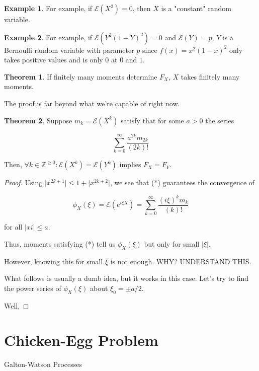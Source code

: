 \documentclass{article}
\theoremstyle{definition}
\newtheorem{theorem}{Theorem}[section]
\newtheorem{example}{Example}[theorem]
\newcommand{\Z}{\mathbb{Z}}
\begin{document}
\begin{example}
    For example, if $\mathcal{E}(X^{2}) = 0$, then $X$ is a "constant" random variable.
\end{example}

\begin{example}
    For example, if $\mathcal{E}(Y^{2}(1-Y)^{2}) = 0$ and $\mathcal{E}(Y) = p$, $Y$ is
    a Bernoulli random variable with parameter $p$ since $f(x) = x^{2}(1-x)^{2}$ only
    takes positive values and is only $0$ at $0$ and $1$.
\end{example}

\begin{theorem}
    If finitely many moments determine $F_{X}$, $X$ takes finitely many moments.
\end{theorem}

The proof is far beyond what we're capable of right now.

\begin{theorem}
    Suppose $m_{k} = \mathcal{E}(X^{k})$ satisfy that for some $a > 0$ the series 

    \[ \sum_{k = 0}^{\infty} \frac{a^{2k}m_{2k}}{(2k)!}\]

    Then, $\forall k \in \Z^{\geq 0}: \mathcal{E}(X^{k}) = \mathcal{E}(Y^{k})$ implies $F_{X} = F_{Y}$.
\end{theorem}
\begin{proof}
    Using $\lvert x^{2k + 1} \rvert \leq 1 + \lvert x ^{2k + 2} \rvert$, we see that (*) guarantees
    the convergence of 

    \[ \phi_{X}(\xi) = \mathcal{E}(e^{i \xi X}) = \sum_{k = 0}^{\infty} \frac{(i\xi)^{k}m_{k}}{(k)!} \]

    for all $\lvert xi \rvert \leq a$.

    Thus, moments satisfying (*) tell us $\phi_{X}(\xi)$ but only for small $\lvert \xi \rvert$.

    However, knowing this for small $\xi$ is not enough. WHY? UNDERSTAND THIS.

    What follows is usually a dumb idea, but it works in this case. Let's try to find the power series
    of $\phi_{X}(\xi)$ about $\xi_{0} = \pm a/2$.

    Well,

    
\end{proof}

\newpage

\section{Chicken-Egg Problem}

Galton-Watson Processes
\end{document}
